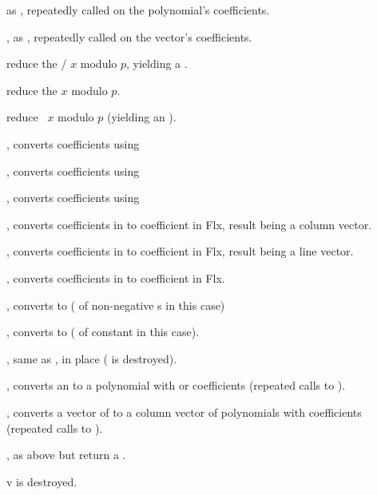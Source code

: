  as ,
repeatedly called on the polynomial's coefficients.

, as ,
repeatedly called on the vector's coefficients.

 reduce the /
$x$ modulo $p$, yielding a .

 reduce the  $x$ modulo $p$.

 reduce ~$x$ modulo $p$
(yielding an ).

, converts coefficients using 

, converts coefficients using 

, converts coefficients using 

, converts coefficients in 
to coefficient in Flx, result being a column vector.

, converts coefficients in 
to coefficient in Flx, result being a line vector.


, converts coefficients in 
to coefficient in Flx.


, converts to  ( of non-negative
s in this case)

, converts to  ( of constant
 in this case).

, same as , in place
( is destroyed).

, converts an  to a polynomial with
 or  coefficients (repeated calls to ).

, converts a vector of  to a column
vector of polynomials with  coefficients (repeated calls to
).

, as above but return a .

 v is destroyed.

